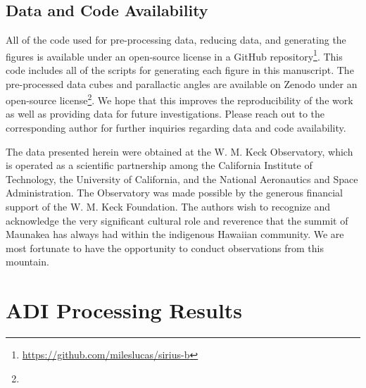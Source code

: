 \documentclass[twocolumn,linenumbers]{aastex631}
\begin{document}
\subsection{Data and Code Availability} \label{sec:data}
All of the code used for pre-processing data, reducing data, and generating the figures is available under an open-source license in a GitHub repository\footnote{\href{https://github.com/mileslucas/sirius-b}{https://github.com/mileslucas/sirius-b}}. This code includes all of the scripts for generating each figure in this manuscript. The pre-processed data cubes and parallactic angles are available on Zenodo under an open-source license\footnote{}. We hope that this improves the reproducibility of the work as well as providing data for future investigations. Please reach out to the corresponding author for further inquiries regarding data and code availability.

\begin{acknowledgements}
The data presented herein were obtained at the W. M. Keck Observatory, which is operated as a scientific partnership among the California Institute of Technology, the University of California, and the National Aeronautics and Space Administration. The Observatory was made possible by the generous financial support of the W. M. Keck Foundation. The authors wish to recognize and acknowledge the very significant cultural role and reverence that the summit of Maunakea has always had within the indigenous Hawaiian community. We are most fortunate to have the opportunity to conduct observations from this mountain.
\end{acknowledgements}




{}


\appendix

\section{ADI Processing Results} \label{sec:adi-results}


\end{document}
